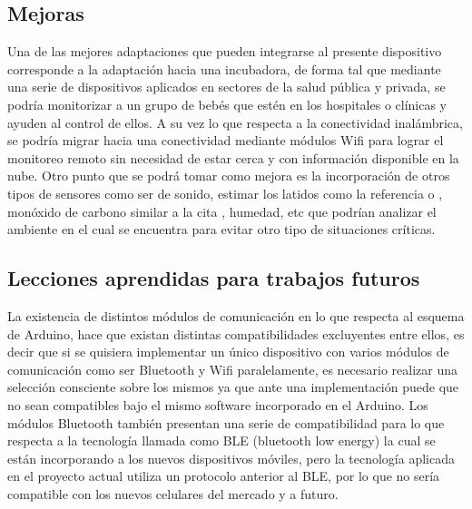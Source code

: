 \documentclass{IEEEtran}
\begin{document}
		\subsection{Mejoras}

			Una de las mejores adaptaciones que pueden integrarse al presente dispositivo corresponde a la adaptación hacia una incubadora, de forma tal que mediante una serie de dispositivos aplicados en sectores de la salud pública y privada, se podría monitorizar a un grupo de bebés que estén en los hospitales o clínicas y ayuden al control de ellos. A su vez lo que respecta a la conectividad inalámbrica, se podría migrar hacia una conectividad mediante módulos Wifi para lograr el monitoreo remoto sin necesidad de estar cerca y con información disponible en la nube. Otro punto que se podrá tomar como mejora es la incorporación de otros tipos de sensores como ser de sonido, estimar los latidos como la referencia \cite{lindberg1996estimation} o \cite{scanlon1996sudden}, monóxido de carbono similar a la cita \cite{esquiroz2017diseno}, humedad, etc que podrían analizar el ambiente en el cual se encuentra para evitar otro tipo de situaciones críticas.

		\subsection{Lecciones aprendidas para trabajos futuros}
			
			La existencia de distintos módulos de comunicación en lo que respecta al esquema de Arduino, hace que existan distintas compatibilidades excluyentes entre ellos, es decir que si se quisiera implementar un único dispositivo con varios módulos de comunicación como ser Bluetooth y Wifi paralelamente, es necesario realizar una selección consciente sobre los mismos ya que ante una implementación puede que no sean compatibles bajo el mismo software incorporado en el Arduino. Los módulos Bluetooth también presentan una serie de compatibilidad para lo que respecta a la tecnología llamada como BLE (bluetooth low energy) la cual se están incorporando a los nuevos dispositivos móviles, pero la tecnología aplicada en el proyecto actual utiliza un protocolo anterior al BLE, por lo que no sería compatible con los nuevos celulares del mercado y a futuro.
\end{document}
